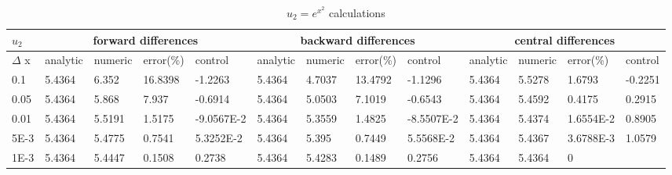 \documentclass[paper=a4, fontsize=11pt]{scrartcl} %
\numberwithin{equation}{section} %
\numberwithin{figure}{section} %
\numberwithin{table}{section} %
\begin{document}
\begin{table}[ht]
\centering
\begin{adjustbox}{width=1\textwidth}
\small
\begin{tabular}{ | l | l | l | l | l | l | l | l | l | l | l | l | l |}
\hline
	$u_2$ & \multicolumn{4}{c|}{forward differences}  & \multicolumn{4}{c|}{backward differences} &  \multicolumn{4}{c|}{central differences}   \\ \hline
	$\Delta$ x & analytic & numeric & error(\%) & control & analytic & numeric & error(\%) & control & analytic & numeric & error(\%) & control \\ \hline
	0.1 & 5.4364 & 6.352 & 16.8398 & -1.2263 & 5.4364 & 4.7037 & 13.4792 & -1.1296 & 5.4364 & 5.5278 & 1.6793 & -0.2251 \\ \hline
	0.05 & 5.4364 & 5.868 & 7.937 & -0.6914 & 5.4364 & 5.0503 & 7.1019 & -0.6543 & 5.4364 & 5.4592 & 0.4175 & 0.2915 \\ \hline
	0.01 & 5.4364 & 5.5191 & 1.5175 & -9.0567E-2 & 5.4364 & 5.3559 & 1.4825 & -8.5507E-2 & 5.4364 & 5.4374 & 1.6554E-2 & 0.8905 \\ \hline
	5E-3 & 5.4364 & 5.4775 & 0.7541 & 5.3252E-2 & 5.4364 & 5.395 & 0.7449 & 5.5568E-2 & 5.4364 & 5.4367 & 3.6788E-3 & 1.0579 \\ \hline
	1E-3 & 5.4364 & 5.4447 & 0.1508 & 0.2738 & 5.4364 & 5.4283 & 0.1489 & 0.2756 & 5.4364 & 5.4364 & 0 &  \\ \hline
\end{tabular}
\end{adjustbox}
\caption{$u_2 = e ^{ {x^ 2}} $ calculations} 
\end{table} 
\end{document}
